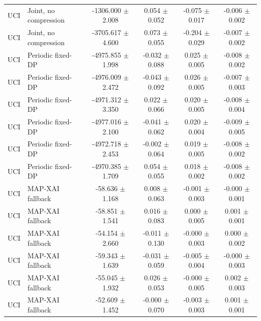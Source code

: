 \begin{tabular}{llcccc}
UCI & Joint, no compression & -1306.000 $\pm$ 2.008 & 0.054 $\pm$ 0.052 & -0.075 $\pm$ 0.017 & -0.006 $\pm$ 0.002 \\
UCI & Joint, no compression & -3705.617 $\pm$ 4.600 & 0.073 $\pm$ 0.055 & -0.204 $\pm$ 0.029 & -0.007 $\pm$ 0.002 \\
UCI & Periodic fixed-DP & -4975.855 $\pm$ 1.998 & -0.032 $\pm$ 0.088 & 0.025 $\pm$ 0.005 & -0.008 $\pm$ 0.002 \\
UCI & Periodic fixed-DP & -4976.009 $\pm$ 2.472 & -0.043 $\pm$ 0.092 & 0.026 $\pm$ 0.005 & -0.007 $\pm$ 0.003 \\
UCI & Periodic fixed-DP & -4971.312 $\pm$ 3.350 & 0.022 $\pm$ 0.066 & 0.020 $\pm$ 0.005 & -0.008 $\pm$ 0.004 \\
UCI & Periodic fixed-DP & -4977.016 $\pm$ 2.100 & -0.041 $\pm$ 0.062 & 0.020 $\pm$ 0.004 & -0.009 $\pm$ 0.005 \\
UCI & Periodic fixed-DP & -4972.718 $\pm$ 2.453 & -0.002 $\pm$ 0.064 & 0.019 $\pm$ 0.005 & -0.008 $\pm$ 0.002 \\
UCI & Periodic fixed-DP & -4970.385 $\pm$ 1.709 & 0.054 $\pm$ 0.055 & 0.018 $\pm$ 0.002 & -0.008 $\pm$ 0.002 \\
UCI & MAP-XAI fallback & -58.636 $\pm$ 1.168 & 0.008 $\pm$ 0.063 & -0.001 $\pm$ 0.003 & -0.000 $\pm$ 0.001 \\
UCI & MAP-XAI fallback & -58.851 $\pm$ 1.541 & 0.016 $\pm$ 0.083 & 0.000 $\pm$ 0.005 & 0.001 $\pm$ 0.001 \\
UCI & MAP-XAI fallback & -54.154 $\pm$ 2.660 & -0.011 $\pm$ 0.130 & -0.000 $\pm$ 0.003 & 0.000 $\pm$ 0.002 \\
UCI & MAP-XAI fallback & -59.343 $\pm$ 1.639 & -0.031 $\pm$ 0.059 & -0.005 $\pm$ 0.004 & -0.000 $\pm$ 0.003 \\
UCI & MAP-XAI fallback & -55.045 $\pm$ 1.932 & 0.026 $\pm$ 0.053 & -0.000 $\pm$ 0.005 & 0.002 $\pm$ 0.003 \\
UCI & MAP-XAI fallback & -52.609 $\pm$ 1.452 & -0.000 $\pm$ 0.070 & -0.003 $\pm$ 0.003 & 0.001 $\pm$ 0.001 \\
\bottomrule
\end{tabular}
